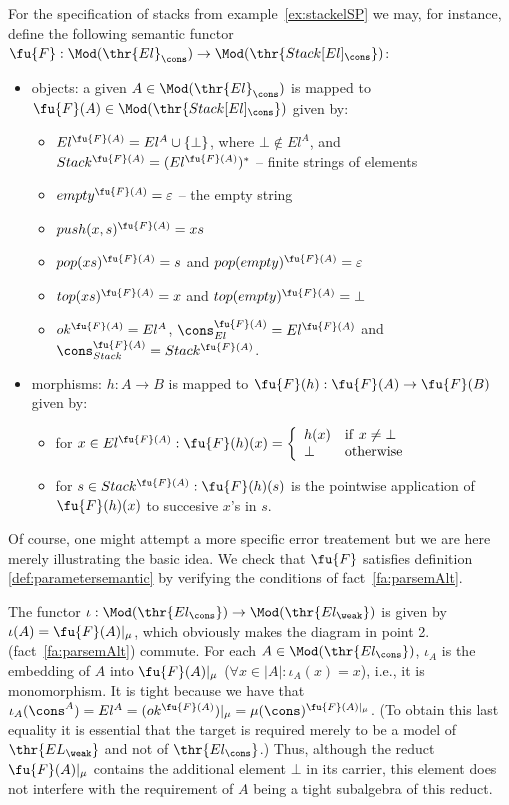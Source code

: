 \begin{example}\label{ex:stackelSem}
For the specification of stacks from example~\ref{ex:stackelSP} we may, for
instance, define the following semantic functor
$\fu{F}:\Mod(\thr{El}_\cons)\to\Mod(\thr{Stack[El]_\cons})$: 
\begin{itemize}\MyLPar
\item objects: a given $A\in\Mod(\thr{El}_\cons)$ is mapped to
$\fu{F}(A)\in\Mod(\thr{Stack[El]_\cons})$ given by:
\begin{itemize}\MyLPar
 \item $El^{\fu{F}(A)} = El^A\cup\{\bot\}$, where $\bot\not\in El^A$, and \\
  $Stack^{\fu{F}(A)} = (El^{\fu{F}(A)})^*$ -- finite strings of elements
 \item $empty^{\fu{F}(A)}=\varepsilon$ -- the empty string
 \item $push(x,s)^{\fu{F}(A)} = xs$
 \item $pop(xs)^{\fu{F}(A)} = s$ and $pop(empty)^{\fu{F}(A)}=\varepsilon$
 \item $top(xs)^{\fu{F}(A)} = x$ and $top(empty)^{\fu{F}(A)}=\bot$
 \item $ok^{\fu{F}(A)} = El^{A}$, $\cons_{El}^{\fu{F}(A)} = El^{\fu{F}(A)}$
  and $\cons_{Stack}^{\fu{F}(A)} = Stack^{\fu{F}(A)}$.
\end{itemize}
\item morphisms: $h:A\to B$ is mapped to $\fu{F}(h):\fu{F}(A)\to \fu{F}(B)$
given by: 
 \begin{itemize}\MyLPar
 \item for $x\in El^{\fu{F}(A)}: \fu{F}(h)(x) = \left\{\begin{array}{ll} h(x) 
 & {\rm if\ }x\not= \bot \\ \bot & {\rm otherwise}
 \end{array}\right.$
 \item  for $s\in Stack^{\fu{F}(A)}: \fu{F}(h)(s)$ is the pointwise 
 application of $\fu{F}(h)(x)$ to succesive $x$'s in $s$. 
 \end{itemize} 
\end{itemize} 
Of course, one might attempt a more specific error treatement but we are here
merely illustrating the basic idea. We check that $\fu{F}$ satisfies 
definition \ref{def:parametersemantic} by verifying the
conditions of fact~\ref{fa:parsemAlt}. 

The functor $\iota:\Mod(\thr{El_\cons}) \to \Mod(\thr{El_\weak})$ is given by
$\iota(A)= \fu{F}(A)|_\mu$, which obviously makes the diagram in point
2. (fact~\ref{fa:parsemAlt}) commute. For each $A\in\Mod({\thr{El_\cons}})$, $\iota_A$ is the embedding of $A$
into $\fu{F}(A)|_\mu$ ($\forall x\in|A|:\iota_A(x)=x$), i.e., it is
monomorphism. It is tight because we have that $\iota_A(\cons^A) = El^A=
(ok^{\fu{F}(A)})|_{\mu} = \mu(\cons)^{\fu{F}(A)|_{\mu}}$. (To obtain this last equality it is essential
that the target is required merely to be a model of $\thr{EL_\weak}$ and not
of $\thr{El_\cons}$.) Thus, although the reduct
${\fu{F}(A)|_{\mu}}$ contains the additional element $\bot$ in its
carrier, this element does not interfere with the requirement of $A$ being a
tight subalgebra of this reduct.
\end{example}
